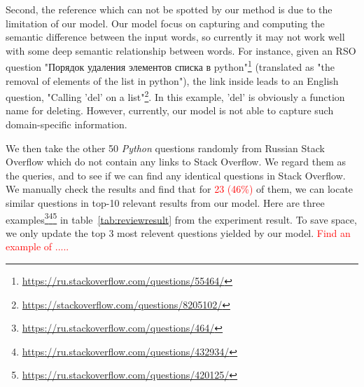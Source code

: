 Second, the reference which can not be spotted by our method is due to the limitation of our model. 
Our model focus on capturing and computing the semantic difference between the input words, so currently it may not work well with some deep semantic relationship between words. 
For instance, given an RSO question "\foreignlanguage{russian}{Порядок удаления элементов списка в python}"\footnote{\url{https://ru.stackoverflow.com/questions/55464/}} (translated as "the removal of elements of the list in python"), 
the link inside leads to an English question, "Calling 'del' on a list"\footnote{\url{https://stackoverflow.com/questions/8205102/}}.
In this example, 'del' is obviously a function name for deleting.
However, currently, our model is not able to capture such domain-specific information.

 We then take the other 50 \textit{Python} questions randomly from Russian Stack Overflow which do not contain any links to Stack Overflow.
 We regard them as the queries, and to see if we can find any identical questions in Stack Overflow.
 We manually check the results and find that for \textcolor{red}{23 (46\%)} of them, we can locate similar questions in top-10 relevant results from our model. 
Here are three examples\footnote{\url{https://ru.stackoverflow.com/questions/464/}}\footnote{\url{https://ru.stackoverflow.com/questions/432934/}}\footnote{\url{https://ru.stackoverflow.com/questions/420125/}} in table~\ref{tab:reviewresult} from the experiment result. 
To save space, we only update the top 3 most relevent questions yielded by our model. 
 \textcolor{red}{Find an example of }
 \textcolor{red}{.....}

